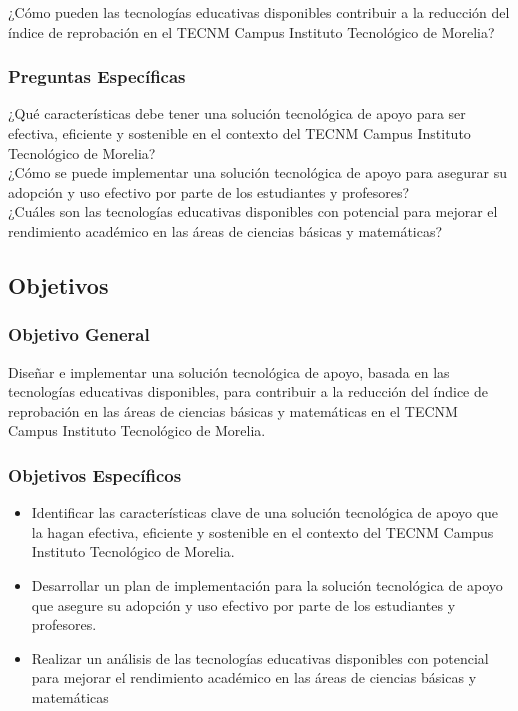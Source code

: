 \documentclass{article}
\begin{document}
    ¿Cómo pueden las tecnologías educativas disponibles contribuir a la reducción del índice de reprobación en el TECNM
     Campus Instituto Tecnológico de Morelia?

    \subsubsection{Preguntas Específicas}

    ¿Qué características debe tener una solución tecnológica de apoyo para ser efectiva, eficiente y sostenible en el
     contexto del TECNM Campus Instituto Tecnológico de Morelia? \\

     ¿Cómo se puede implementar una solución tecnológica de apoyo para asegurar su adopción y uso efectivo por parte de
      los estudiantes y profesores? \\

      ¿Cuáles son las tecnologías educativas disponibles con potencial para mejorar el rendimiento académico en las áreas
       de ciencias básicas y matemáticas?

\subsection{Objetivos}
    \subsubsection{Objetivo General}

    Diseñar e implementar una solución tecnológica de apoyo, basada en las tecnologías educativas disponibles, para
     contribuir a la reducción del índice de reprobación en las áreas de ciencias básicas y matemáticas en el TECNM
      Campus Instituto Tecnológico de Morelia.

    \subsubsection{Objetivos Específicos}
    \begin{itemize}
        \item Identificar las características clave de una solución tecnológica de apoyo que la hagan efectiva, eficiente y 
        sostenible en el contexto del TECNM Campus Instituto Tecnológico de Morelia.
    
        \item Desarrollar un plan de implementación para la solución tecnológica de apoyo que asegure su adopción y uso 
        efectivo por parte de los estudiantes y profesores.

        \item Realizar un análisis de las tecnologías educativas disponibles con potencial para mejorar el rendimiento
         académico en las áreas de ciencias básicas y matemáticas
        \end{itemize}
\end{document}
